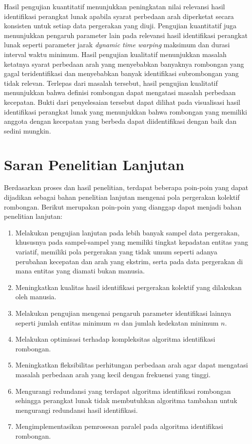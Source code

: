 Hasil pengujian kuantitatif menunjukkan peningkatan nilai relevansi hasil identifikasi perangkat lunak apabila syarat perbedaan arah diperketat secara konsisten untuk setiap data pergerakan yang diuji. Pengujian kuantitatif juga menunjukkan pengaruh parameter lain pada relevansi hasil identifikasi perangkat lunak seperti parameter jarak \textit{dynamic time warping} maksimum dan durasi interval waktu minimum. Hasil pengujian kualitatif menunjukkan masalah ketatnya syarat perbedaan arah yang menyebabkan banyaknya rombongan yang gagal teridentifikasi dan menyebabkan banyak identifikasi subrombongan yang tidak relevan. Terlepas dari masalah tersebut, hasil pengujian kualitatif menunjukkan bahwa definisi rombongan dapat mengatasi masalah perbedaan kecepatan. Bukti dari penyelesaian tersebut dapat dilihat pada visualisasi hasil identifikasi perangkat lunak yang menunjukkan bahwa rombongan yang memiliki anggota dengan kecepatan yang berbeda dapat diidentifikasi dengan baik dan sedini mungkin.

\section{Saran Penelitian Lanjutan}
\label{sec:saran}

Berdasarkan proses dan hasil penelitian, terdapat beberapa poin-poin yang dapat dijadikan sebagai bahan penelitian lanjutan mengenai pola pergerakan kolektif rombongan. Berikut merupakan poin-poin yang dianggap dapat menjadi bahan penelitian lanjutan:

\begin{enumerate}
    \item Melakukan pengujian lanjutan pada lebih banyak sampel data pergerakan, khususnya pada sampel-sampel yang memiliki tingkat kepadatan entitas yang variatif, memiliki pola pergerakan yang tidak umum seperti adanya perubahan kecepatan dan arah yang ekstrim, serta pada data pergerakan di mana entitas yang diamati bukan manusia.
    \item Meningkatkan kualitas hasil identifikasi pergerakan kolektif yang dilakukan oleh manusia.
    \item Melakukan pengujian mengenai pengaruh parameter identifikasi lainnya seperti jumlah entitas minimum $m$ dan jumlah kedekatan minimum $n$.
    \item Melakukan optimisasi terhadap kompleksitas algoritma identifikasi rombongan.
    \item Meningkatkan fleksibilitas perhitungan perbedaan arah agar dapat mengatasi masalah perbedaan arah yang kecil dengan frekuensi yang tinggi.
    \item Mengurangi redundansi yang terdapat algoritma identifikasi rombongan sehingga perangkat lunak tidak membutuhkan algoritma tambahan untuk mengurangi redundansi hasil identifikasi.
    \item Mengimplementasikan pemrosesan paralel pada algoritma identifikasi rombongan.
\end{enumerate}